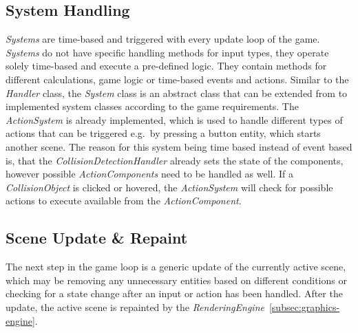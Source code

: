 \subsection{System Handling}\label{subsec:system-handling}
\textit{Systems} are time-based and triggered with every update loop of the game.
\textit{Systems} do not have specific handling methods for input types, they operate solely time-based and execute a pre-defined logic.
They contain methods for different calculations, game logic or time-based events and actions.
Similar to the \textit{Handler} class, the \textit{System} class is an abstract class that can be extended from to implemented system classes according to the game requirements.
The \textit{ActionSystem} is already implemented, which is used to handle different types of actions that can be triggered e.g.\ by pressing a button entity, which starts
another scene.
The reason for this system being time based instead of event based is, that the \textit{CollisionDetectionHandler} already sets the state of the components,
however possible \textit{ActionComponents} need to be handled as well.
If a \textit{CollisionObject} is clicked or hovered, the \textit{ActionSystem} will check for possible actions to execute available from the \textit{ActionComponent}.

\subsection{Scene Update \& Repaint}\label{subsec:scene-update-&-repaint}
The next step in the game loop is a generic update of the currently active scene, which may be removing any unnecessary entities based on different conditions or
checking for a state change after an input or action has been handled.
After the update, the active scene is repainted by the \textit{RenderingEngine}~\ref{subsec:graphics-engine}.

